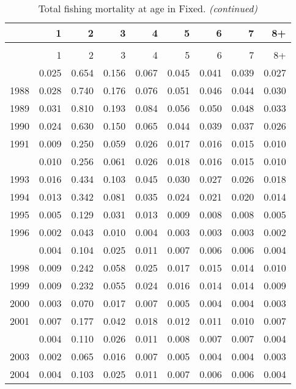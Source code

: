\documentclass[
]{article}
\begin{document}
\begin{longtable}[t]{lrrrrrrrr}
\caption{\label{tab:Fixed-fleet-FAA-table}Total fishing mortality at age in Fixed.}\\
\toprule
  & 1 & 2 & 3 & 4 & 5 & 6 & 7 & 8+\\
\midrule
\endfirsthead
\caption[]{Total fishing mortality at age in Fixed. \textit{(continued)}}\\
\toprule
  & 1 & 2 & 3 & 4 & 5 & 6 & 7 & 8+\\
\midrule
\endhead

\endfoot
\bottomrule
\endlastfoot
1987 & 0.025 & 0.654 & 0.156 & 0.067 & 0.045 & 0.041 & 0.039 & 0.027\\
1988 & 0.028 & 0.740 & 0.176 & 0.076 & 0.051 & 0.046 & 0.044 & 0.030\\
1989 & 0.031 & 0.810 & 0.193 & 0.084 & 0.056 & 0.050 & 0.048 & 0.033\\
1990 & 0.024 & 0.630 & 0.150 & 0.065 & 0.044 & 0.039 & 0.037 & 0.026\\
1991 & 0.009 & 0.250 & 0.059 & 0.026 & 0.017 & 0.016 & 0.015 & 0.010\\
\addlinespace
1992 & 0.010 & 0.256 & 0.061 & 0.026 & 0.018 & 0.016 & 0.015 & 0.010\\
1993 & 0.016 & 0.434 & 0.103 & 0.045 & 0.030 & 0.027 & 0.026 & 0.018\\
1994 & 0.013 & 0.342 & 0.081 & 0.035 & 0.024 & 0.021 & 0.020 & 0.014\\
1995 & 0.005 & 0.129 & 0.031 & 0.013 & 0.009 & 0.008 & 0.008 & 0.005\\
1996 & 0.002 & 0.043 & 0.010 & 0.004 & 0.003 & 0.003 & 0.003 & 0.002\\
\addlinespace
1997 & 0.004 & 0.104 & 0.025 & 0.011 & 0.007 & 0.006 & 0.006 & 0.004\\
1998 & 0.009 & 0.242 & 0.058 & 0.025 & 0.017 & 0.015 & 0.014 & 0.010\\
1999 & 0.009 & 0.232 & 0.055 & 0.024 & 0.016 & 0.014 & 0.014 & 0.009\\
2000 & 0.003 & 0.070 & 0.017 & 0.007 & 0.005 & 0.004 & 0.004 & 0.003\\
2001 & 0.007 & 0.177 & 0.042 & 0.018 & 0.012 & 0.011 & 0.010 & 0.007\\
\addlinespace
2002 & 0.004 & 0.110 & 0.026 & 0.011 & 0.008 & 0.007 & 0.007 & 0.004\\
2003 & 0.002 & 0.065 & 0.016 & 0.007 & 0.005 & 0.004 & 0.004 & 0.003\\
2004 & 0.004 & 0.103 & 0.025 & 0.011 & 0.007 & 0.006 & 0.006 & 0.004\\

\end{longtable}
\end{document}

